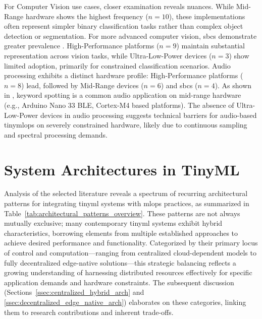 For Computer Vision use cases, closer examination reveals nuances. While Mid-Range hardware shows the highest frequency ($n=10$), these implementations often represent simpler binary classification tasks rather than complex object detection or segmentation. For more advanced computer vision, \glspl{sbc} demonstrate greater prevalence \cite{renOndeviceOnlineLearning2024}. High-Performance platforms ($n=9$) maintain substantial representation across vision tasks, while Ultra-Low-Power devices ($n=3$) show limited adoption, primarily for constrained classification scenarios. Audio processing exhibits a distinct hardware profile: High-Performance platforms ($n=8$) lead, followed by Mid-Range devices ($n=6$) and \glspl{sbc} ($n=4$). As shown in \cite{grauOnDeviceTrainingMachine2021}, keyword spotting is a common audio application on mid-range hardware (e.g., Arduino Nano 33 BLE, Cortex-M4 based platforms). The absence of Ultra-Low-Power devices in audio processing suggests technical barriers for audio-based \gls{tinymlops} on severely constrained hardware, likely due to continuous sampling and spectral processing demands.

\section{System Architectures in TinyML}
\label{sec:RQ1_Results_SystemArchitecture}

Analysis of the selected literature reveals a spectrum of recurring architectural patterns for integrating \gls{tinyml} systems with \gls{mlops} practices, as summarized in Table~\ref{tab:architectural_patterns_overview}. These patterns are not always mutually exclusive; many contemporary \gls{tinyml} systems exhibit hybrid characteristics, borrowing elements from multiple established approaches to achieve desired performance and functionality. Categorized by their primary locus of control and computation—ranging from centralized cloud-dependent models to fully decentralized edge-native solutions—this strategic balancing reflects a growing understanding of harnessing distributed resources effectively for specific application demands and hardware constraints. The subsequent discussion (Sections~\ref{ssec:centralized_hybrid_arch} and \ref{ssec:decentralized_edge_native_arch}) elaborates on these categories, linking them to research contributions and inherent trade-offs.

